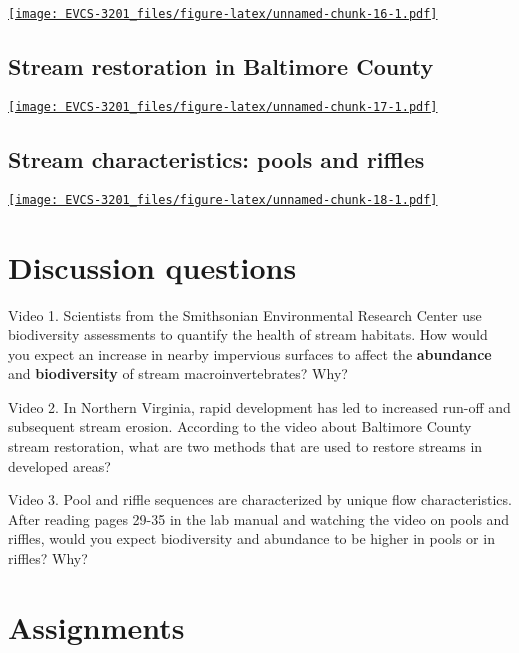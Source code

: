 \documentclass[]{book}
\begin{document}
\href{https://www.youtube.com/embed/wZGzqDfoIks}{\texttt{[image: EVCS-3201\_files/figure-latex/unnamed-chunk-16-1.pdf]}}

\subsection*{Stream restoration in Baltimore
County}\label{stream-restoration-in-baltimore-county}

\href{https://www.youtube.com/embed/jIGoCM2sCBM}{\texttt{[image: EVCS-3201\_files/figure-latex/unnamed-chunk-17-1.pdf]}}

\subsection*{Stream characteristics: pools and
riffles}\label{stream-characteristics-pools-and-riffles}

\href{https://www.youtube.com/embed/RGM1X6rcWEE}{\texttt{[image: EVCS-3201\_files/figure-latex/unnamed-chunk-18-1.pdf]}}

\section{Discussion questions}\label{discussion-questions}

Video 1. Scientists from the Smithsonian Environmental Research Center
use biodiversity assessments to quantify the health of stream habitats.
How would you expect an increase in nearby impervious surfaces to affect
the \textbf{abundance} and \textbf{biodiversity} of stream
macroinvertebrates? Why?

Video 2. In Northern Virginia, rapid development has led to increased
run-off and subsequent stream erosion. According to the video about
Baltimore County stream restoration, what are two methods that are used
to restore streams in developed areas?

Video 3. Pool and riffle sequences are characterized by unique flow
characteristics. After reading pages 29-35 in the lab manual and
watching the video on pools and riffles, would you expect biodiversity
and abundance to be higher in pools or in riffles? Why?

\section{Assignments}\label{assignments}
\end{document}
